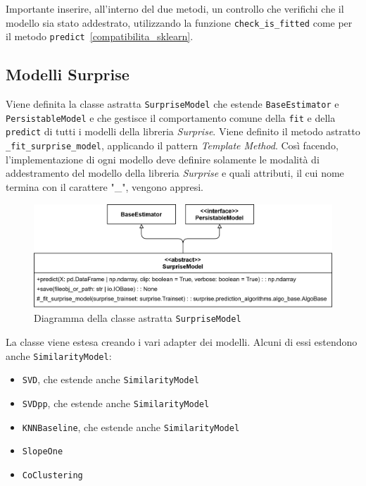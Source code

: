 Importante inserire, all'interno del due metodi, un controllo che verifichi che il modello sia stato addestrato, utilizzando la funzione \texttt{check\_is\_fitted} come per il metodo \texttt{predict}~\ref{compatibilita_sklearn}.

\subsection{Modelli Surprise}

Viene definita la classe astratta \texttt{SurpriseModel} che estende \texttt{BaseEstimator} e \texttt{PersistableModel} e che gestisce il comportamento comune della \texttt{fit} e della \texttt{predict} di tutti i modelli della libreria \textit{Surprise}. Viene definito il metodo astratto \texttt{\_fit\_surprise\_model}, applicando il pattern \textit{Template Method}. Così facendo, l'implementazione di ogni modello deve definire solamente le modalità di addestramento del modello della libreria \textit{Surprise} e quali attributi, il cui nome termina con il carattere "\_", vengono appresi.

\begin{figure}[H]
    \centering
    \includegraphics[scale=0.17]{figures/UML/models/surprise_model.png}
    \caption{Diagramma della classe astratta \texttt{SurpriseModel}}
\end{figure}


La classe viene estesa creando i vari adapter dei modelli. Alcuni di essi estendono anche \texttt{SimilarityModel}:

\begin{itemize}
    \item \texttt{SVD}, che estende anche \texttt{SimilarityModel}
    \item \texttt{SVDpp}, che estende anche \texttt{SimilarityModel}
    \item \texttt{KNNBaseline}, che estende anche \texttt{SimilarityModel}
    \item \texttt{SlopeOne}
    \item \texttt{CoClustering}
\end{itemize}

